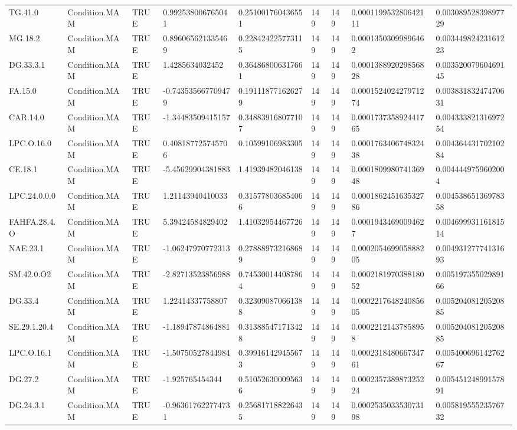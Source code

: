 \begin{longtable}{lllllllll}
TG.41.0 & Condition.MAM & TRUE & 0.992538006765041 & 0.251001760436551 & 149 & 149 & 0.000119953280642111 & 0.00308952839897729 \\
MG.18.2 & Condition.MAM & TRUE & 0.896065621335469 & 0.228424225773115 & 149 & 149 & 0.00013503099896462 & 0.00344982423161223 \\
DG.33.3.1 & Condition.MAM & TRUE & 1.4285634032452 & 0.364868006317661 & 149 & 149 & 0.000138892029856828 & 0.00352007960469145 \\
FA.15.0 & Condition.MAM & TRUE & -0.743535667709479 & 0.191118771626279 & 149 & 149 & 0.000152402427971274 & 0.00383183247470631 \\
CAR.14.0 & Condition.MAM & TRUE & -1.34483509415157 & 0.348839168077107 & 149 & 149 & 0.000173735892441765 & 0.00433382131697254 \\
LPC.O.16.0 & Condition.MAM & TRUE & 0.408187725745706 & 0.10599106983305 & 149 & 149 & 0.000176340674832438 & 0.00436443170210284 \\
CE.18.1 & Condition.MAM & TRUE & -5.45629904381883 & 1.41939482046138 & 149 & 149 & 0.000180998074136948 & 0.0044449759602004 \\
LPC.24.0.0.0 & Condition.MAM & TRUE & 1.21143940410033 & 0.315778036854066 & 149 & 149 & 0.000186245163532786 & 0.00453865136978358 \\
FAHFA.28.4.O & Condition.MAM & TRUE & 5.39424584829402 & 1.41032954467726 & 149 & 149 & 0.00019434690094627 & 0.00469993116181514 \\
NAE.23.1 & Condition.MAM & TRUE & -1.06247970772313 & 0.278889732168689 & 149 & 149 & 0.000205469905888205 & 0.00493127774131693 \\
SM.42.0.O2 & Condition.MAM & TRUE & -2.82713523856988 & 0.745300144087864 & 149 & 149 & 0.000218197038818052 & 0.00519735502989166 \\
DG.33.4 & Condition.MAM & TRUE & 1.22414337758807 & 0.323090870661388 & 149 & 149 & 0.000221764824085605 & 0.00520408120520885 \\
SE.29.1.20.4 & Condition.MAM & TRUE & -1.18947874864881 & 0.313885471713428 & 149 & 149 & 0.00022121437858958 & 0.00520408120520885 \\
LPC.O.16.1 & Condition.MAM & TRUE & -1.50750527844984 & 0.399161429455673 & 149 & 149 & 0.000231848066734761 & 0.00540069614276267 \\
DG.27.2 & Condition.MAM & TRUE & -1.925765454344 & 0.510526300095636 & 149 & 149 & 0.000235738987325224 & 0.00545124899157891 \\
DG.24.3.1 & Condition.MAM & TRUE & -0.963617622774731 & 0.256817188226435 & 149 & 149 & 0.000253503353073198 & 0.00581955523576732 \\

\end{longtable}
